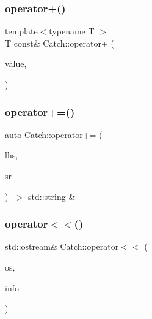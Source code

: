 \mbox{\label{namespace_catch_a5e95b3c47a7618db3649dc39b0bb9004}} 
\subsubsection{\texorpdfstring{operator+()}{operator+()}}
{\footnotesize\ttfamily template$<$typename T $>$ \\
T const\& Catch\+::operator+ (\begin{DoxyParamCaption}\item[{T const \&}]{value,  }\item[{\mbox{\hyperlink{struct_catch_1_1_stream_end_stop}{Stream\+End\+Stop}}}]{ }\end{DoxyParamCaption})}

\mbox{\label{namespace_catch_a61711bc909f8dc76d8b3deccc1440f46}} 
\subsubsection{\texorpdfstring{operator+=()}{operator+=()}}
{\footnotesize\ttfamily auto Catch\+::operator+= (\begin{DoxyParamCaption}\item[{std\+::string \&}]{lhs,  }\item[{\mbox{\hyperlink{class_catch_1_1_string_ref}{String\+Ref}} const \&}]{sr }\end{DoxyParamCaption}) -\/$>$  std\+::string \&}

\mbox{\label{namespace_catch_a6ec18b5054d7fdfdde861c580b082995}} 
\subsubsection{\texorpdfstring{operator$<$$<$()}{operator<<()}\hspace{0.1cm}{\footnotesize\ttfamily [1/2]}}
{\footnotesize\ttfamily std\+::ostream\& Catch\+::operator$<$$<$ (\begin{DoxyParamCaption}\item[{std\+::ostream \&}]{os,  }\item[{\mbox{\hyperlink{struct_catch_1_1_source_line_info}{Source\+Line\+Info}} const \&}]{info }\end{DoxyParamCaption})}

